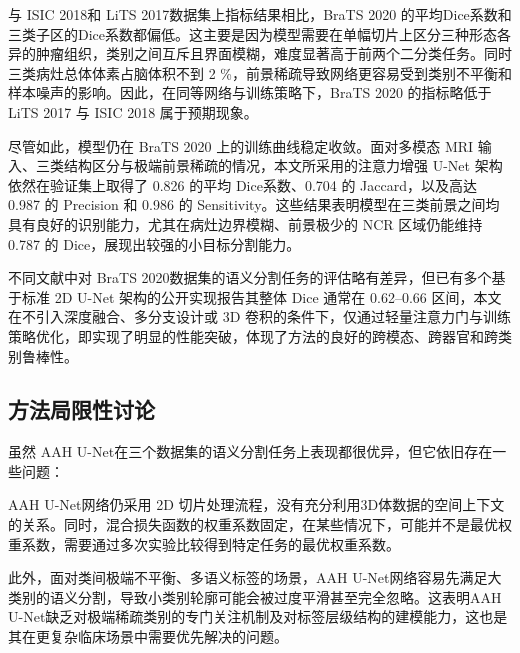 与 ISIC 2018和 LiTS 2017数据集上指标结果相比，BraTS 2020 的平均Dice系数和三类子区的Dice系数都偏低。这主要是因为模型需要在单幅切片上区分三种形态各异的肿瘤组织，类别之间互斥且界面模糊，难度显著高于前两个二分类任务。同时三类病灶总体体素占脑体积不到 2 \%，前景稀疏导致网络更容易受到类别不平衡和样本噪声的影响。因此，在同等网络与训练策略下，BraTS 2020 的指标略低于 LiTS 2017 与 ISIC 2018 属于预期现象。

尽管如此，模型仍在 BraTS 2020 上的训练曲线稳定收敛。面对多模态 MRI 输入、三类结构区分与极端前景稀疏的情况，本文所采用的注意力增强 U-Net 架构依然在验证集上取得了 0.826 的平均 Dice系数、0.704 的 Jaccard，以及高达 0.987 的 Precision 和 0.986 的 Sensitivity。这些结果表明模型在三类前景之间均具有良好的识别能力，尤其在病灶边界模糊、前景极少的 NCR 区域仍能维持 0.787 的 Dice，展现出较强的小目标分割能力。

不同文献中对 BraTS 2020数据集的语义分割任务的评估略有差异\cite{islam2020,wang2021,menze2015}，但已有多个基于标准 2D U-Net 架构的公开实现报告其整体 Dice 通常在 0.62–0.66 区间，本文在不引入深度融合、多分支设计或 3D 卷积的条件下，仅通过轻量注意力门与训练策略优化，即实现了明显的性能突破，体现了方法的良好的跨模态、跨器官和跨类别鲁棒性。

\subsection{方法局限性讨论}

虽然 AAH U-Net在三个数据集的语义分割任务上表现都很优异，但它依旧存在一些问题：

AAH U-Net网络仍采用 2D 切片处理流程，没有充分利用3D体数据的空间上下文的关系。同时，混合损失函数的权重系数固定，在某些情况下，可能并不是最优权重系数，需要通过多次实验比较得到特定任务的最优权重系数。

此外，面对类间极端不平衡、多语义标签的场景，AAH U-Net网络容易先满足大类别的语义分割，导致小类别轮廓可能会被过度平滑甚至完全忽略。这表明AAH U-Net缺乏对极端稀疏类别的专门关注机制及对标签层级结构的建模能力，这也是其在更复杂临床场景中需要优先解决的问题。